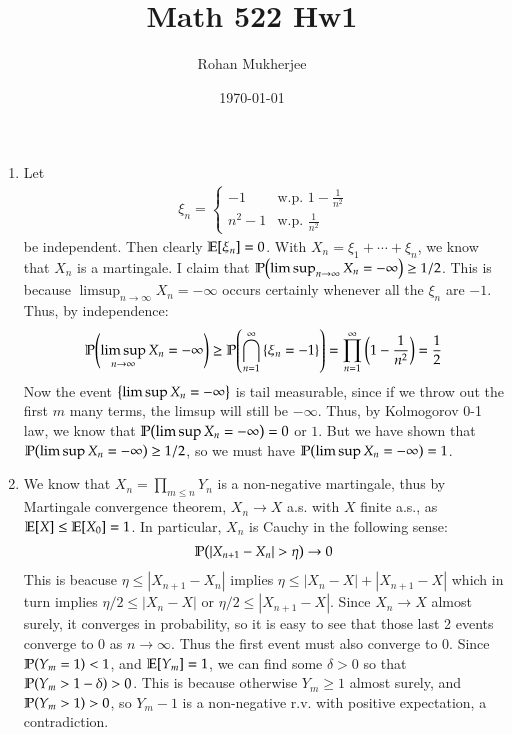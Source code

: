\documentclass[12pt]{article}
\title{Math 522 Hw1}
\date{\today}
\author{Rohan Mukherjee}
\theoremstyle{definitionstyle}
\newcommand{\SET}[1]{\Set{\mskip-\medmuskip #1 \mskip-\medmuskip}}
\newcommand{\1}{\mathds 1}
\renewcommand{\P}{\mathbb P \qty}
\newcommand{\E}{\mathbb E \qty}
\begin{document}
    \maketitle
    \begin{enumerate}
        \item Let \begin{align*}
            \xi_n = \begin{cases}
                -1 & \text{w.p. } 1-\frac{1}{n^2} \\
                n^2 - 1 & \text{w.p. } \frac{1}{n^2}
            \end{cases}
        \end{align*}
        be independent. Then clearly $\E[\xi_n] = 0$. With $X_n = \xi_1 + \cdots + \xi_n$, we know that $X_n$ is a martingale. I claim that $\P(\limsup_{n \to \infty} X_n = -\infty) \geq 1/2$. This is because $\limsup_{n \to \infty} X_n = -\infty$ occurs certainly whenever all the $\xi_n$ are $-1$. Thus, by independence:
        \begin{align*}
            \P(\limsup_{n \to \infty} X_n = -\infty) \geq \P(\bigcap_{n=1}^\infty \SET{\xi_n = -1}) = \prod_{n=1}^\infty \qty(1-\frac{1}{n^2}) = \frac{1}{2}
        \end{align*}
        Now the event $\SET{\limsup X_n = -\infty}$ is tail measurable, since if we throw out the first $m$ many terms, the limsup will still be $-\infty$. Thus, by Kolmogorov 0-1 law, we know that $\P(\limsup X_n = -\infty) = 0$ or $1$. But we have shown that $\P(\limsup X_n = -\infty) \geq 1/2$, so we must have $\P(\limsup X_n = -\infty) = 1$.

        \item We know that $X_n = \prod_{m \leq n} Y_n$ is a non-negative martingale, thus by Martingale convergence theorem, $X_n \to X$ a.s. with $X$ finite a.s., as $\E[X] \leq \E[X_0] = 1$. In particular, $X_n$ is Cauchy in the following sense:
        \begin{align*}
            \P(|X_{n+1} - X_n| > \eta) \to 0
        \end{align*}
        This is beacuse $\eta \leq |X_{n+1}-X_n|$ implies $\eta \leq |X_n-X| + |X_{n+1} - X|$ which in turn implies $\eta/2 \leq |X_n-X|$ or $\eta/2 \leq |X_{n+1} - X|$. Since $X_n \to X$ almost surely, it converges in probability, so it is easy to see that those last 2 events converge to 0 as $n \to \infty$. Thus the first event must also converge to 0. Since $\P(Y_m = 1) < 1$, and $\E[Y_m] = 1$, we can find some $\delta > 0$ so that $\P(Y_m > 1-\delta) > 0$. This is because otherwise $Y_m \geq 1$ almost surely, and $\P(Y_m > 1) > 0$, so $Y_m - 1$ is a non-negative r.v. with positive expectation, a contradiction. 


\end{enumerate}
\end{document}
